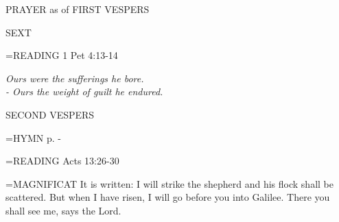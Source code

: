 \begin{flushleft}\normalsize PRAYER as of FIRST VESPERS\\\end{flushleft}

\begin{flushleft}\normalsize SEXT\\\end{flushleft}

\hangindent=\parindent \small{READING}    1 Pet 4:13-14 \textbf{   }

\begin{center}
\textit{Ours were the sufferings he bore.\\
- Ours the weight of guilt he endured.}
\end{center}

\begin{flushleft}\normalsize SECOND VESPERS\\\end{flushleft}

\hangindent=\parindent \small{\uppercase{HYMN} p.  \pageref{holyweek:firstHymn} - \pageref{holyweek:lastHymn}\\}

\hangindent=\parindent \small{READING}    Acts 13:26-30 \textbf{   \\}

\hangindent=\parindent \small{MAGNIFICAT 	It is written: I will strike the shepherd and his flock shall be scattered. But when I have risen, I will go before you into Galilee. There you shall see me, says the Lord.\\}

